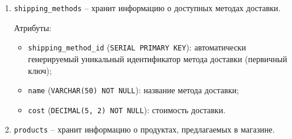 \documentclass[master,paper]{pmk-graduate}
\begin{document}
\begin{enumerate}
Атрибуты:
\begin{itemize}
	\item \texttt{order\_id} (\texttt{SERIAL PRIMARY KEY}): автоматически генерируемый уникальный идентификатор заказа (первичный ключ);
	\item \texttt{customer\_id} (\texttt{INTEGER NOT NULL}): идентификатор покупателя, сделавшего заказ (является внешним ключом, ссылающимся на таблицу \texttt{customers}, обеспечивая связь между заказами и покупателями);
	\item \texttt{order\_date} (\texttt{TIMESTAMP DEFAULT NOW()}): дата и время оформления заказа;
	\item \texttt{shipping\_address} (\texttt{VARCHAR(200)}): адрес доставки заказа;
	\item \texttt{total\_amount} (\texttt{DECIMAL(10, 2)} \texttt{CHECK (total\_amount > 0)} \texttt{NOT} \\\texttt{NULL}): общая сумма заказа (должна быть больше нуля);
	\item \texttt{status} (\texttt{VARCHAR(20) CHECK (status IN (‘PROCESSING’, ‘DELI\-VERED’, PENDING’, ‘CANCELLED’, ‘SHIPPED’))}): статус заказа, а именно -- <<Обработка>>, <<Доставлен>>, <<Ожидание>>, <<Отправлен>>, <<Отменен>> (\texttt{CHECK}-ограничение гарантирует, что статус заказа будет одним из допустимых значений);
	\item \texttt{shipping\_method\_id} (\texttt{INTEGER}): идентификатор метода доставки, использованного для заказа (является внешним ключом, ссылающимся на таблицу \texttt{shipping\_methods}).
\end{itemize}

\item \texttt{shipping\_methods} -- хранит информацию о доступных методах доставки.

Атрибуты:
\begin{itemize}
	\item \texttt{shipping\_method\_id} (\texttt{SERIAL PRIMARY KEY}): автоматически генерируемый уникальный идентификатор метода доставки (первичный ключ);
	\item \texttt{name} (\texttt{VARCHAR(50) NOT NULL}): название метода доставки;
	\item \texttt{cost} (\texttt{DECIMAL(5, 2) NOT NULL}): стоимость доставки.
\end{itemize}

\item \texttt{products} -- хранит информацию о продуктах, предлагаемых в магазине.


\end{enumerate}
\end{document}
